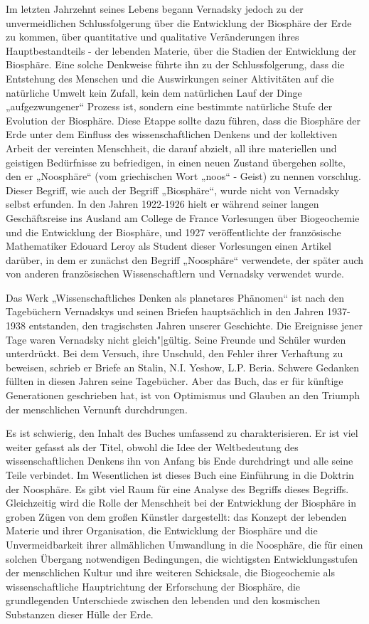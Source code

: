 \documentclass[11pt,a4paper]{article}
\begin{document}
Im letzten Jahrzehnt seines Lebens begann Vernadsky jedoch zu der
unvermeidlichen Schlussfolgerung über die Entwicklung der Biosphäre der Erde
zu kommen, über quantitative und qualitative Veränderungen ihres
Hauptbestandteils - der lebenden Materie, über die Stadien der Entwicklung der
Biosphäre. Eine solche Denkweise führte ihn zu der Schlussfolgerung, dass die
Entstehung des Menschen und die Auswirkungen seiner Aktivitäten auf die
natürliche Umwelt kein Zufall, kein dem natürlichen Lauf der Dinge
„aufgezwungener“ Prozess ist, sondern eine bestimmte natürliche Stufe der
Evolution der Biosphäre. Diese Etappe sollte dazu führen, dass die Biosphäre
der Erde unter dem Einfluss des wissenschaftlichen Denkens und der kollektiven
Arbeit der vereinten Menschheit, die darauf abzielt, all ihre materiellen und
geistigen Bedürfnisse zu befriedigen, in einen neuen Zustand übergehen sollte,
den er „Noosphäre“ (vom griechischen Wort „noos“ - Geist) zu nennen vorschlug.
Dieser Begriff, wie auch der Begriff „Biosphäre“, wurde nicht von Vernadsky
selbst erfunden. In den Jahren 1922-1926 hielt er während seiner langen
Geschäftsreise ins Ausland am College de France Vorlesungen über Biogeochemie
und die Entwicklung der Biosphäre, und 1927 veröffentlichte der französische
Mathematiker Edouard Leroy als Student dieser Vorlesungen einen Artikel
darüber, in dem er zunächst den Begriff „Noosphäre“ verwendete, der später
auch von anderen französischen Wissenschaftlern und Vernadsky verwendet wurde.

Das Werk „Wissenschaftliches Denken als planetares Phänomen“ ist nach den
Tagebüchern Vernadskys und seinen Briefen hauptsächlich in den Jahren
1937-1938 entstanden, den tragischsten Jahren unserer Geschichte. Die
Ereignisse jener Tage waren Vernadsky nicht gleich"|gültig. Seine Freunde und
Schüler wurden unterdrückt. Bei dem Versuch, ihre Unschuld, den Fehler ihrer
Verhaftung zu beweisen, schrieb er Briefe an Stalin, N.I. Yeshow, L.P. Beria.
Schwere Gedanken füllten in diesen Jahren seine Tagebücher. Aber das Buch, das
er für künftige Generationen geschrieben hat, ist von Optimismus und Glauben
an den Triumph der menschlichen Vernunft durchdrungen.

Es ist schwierig, den Inhalt des Buches umfassend zu charakterisieren. Er ist
viel weiter gefasst als der Titel, obwohl die Idee der Weltbedeutung des
wissenschaftlichen Denkens ihn von Anfang bis Ende durchdringt und alle seine
Teile verbindet. Im Wesentlichen ist dieses Buch eine Einführung in die
Doktrin der Noosphäre. Es gibt viel Raum für eine Analyse des Begriffs dieses
Begriffs. Gleichzeitig wird die Rolle der Menschheit bei der Entwicklung der
Biosphäre in groben Zügen von dem großen Künstler dargestellt: das Konzept der
lebenden Materie und ihrer Organisation, die Entwicklung der Biosphäre und die
Unvermeidbarkeit ihrer allmählichen Umwandlung in die Noosphäre, die für einen
solchen Übergang notwendigen Bedingungen, die wichtigsten Entwicklungsstufen
der menschlichen Kultur und ihre weiteren Schicksale, die Biogeochemie als
wissenschaftliche Hauptrichtung der Erforschung der Biosphäre, die
grundlegenden Unterschiede zwischen den lebenden und den kosmischen Substanzen
dieser Hülle der Erde.
\end{document}
